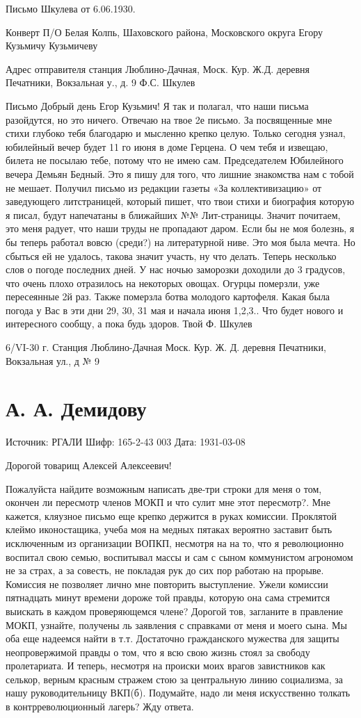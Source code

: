 \documentclass[]{memoir}
\begin{document}
Письмо Шкулева от 6.06.1930.


Конверт
П/О Белая Колпь, Шаховского района, Московского округа
Егору Кузьмичу Кузьмичеву

Адрес отправителя
станция Люблино-Дачная, Моск. Кур. Ж.Д. деревня Печатники, Вокзальная у., д. 9 Ф.С. Шкулев


Письмо
Добрый день 
Егор Кузьмич!
Я так и полагал, что наши письма разойдутся, но это ничего. Отвечаю на твое 2е письмо. За посвященные мне стихи глубоко тебя благодарю и мысленно крепко целую. Только сегодня узнал, юбилейный вечер будет 11 го июня в доме Герцена. О чем тебя и извещаю, билета не посылаю тебе, потому что не имею сам.
Председателем Юбилейного вечера Демьян Бедный. Это я пишу для того, что лишние знакомства нам с тобой не мешает. 
Получил письмо из редакции газеты «За коллективизацию» от заведующего литстраницей, который пишет, что твои стихи и биография которую я писал, будут напечатаны в ближайших №№ Лит-страницы. Значит почитаем, это меня радует, что наши труды не пропадают даром.
Если бы не моя болезнь, я бы теперь работал вовсю (среди?) на литературной ниве. Это моя была мечта. Но сбыться ей не удалось, такова значит участь, ну что делать.
Теперь несколько слов о погоде последних дней. У нас ночью заморозки доходили до 3 градусов, что очень плохо отразилось на некоторых овощах. Огурцы померзли, уже пересеянные 2й раз. Также померзла ботва молодого картофеля. Какая была погода у Вас в эти дни 29, 30, 31 мая и начала июня 1,2,3..
Что будет нового и интересного сообщу, а пока будь здоров.
Твой Ф. Шкулев

6/VI-30 г.
Станция Люблино-Дачная Моск. Кур. Ж. Д. 
деревня Печатники, Вокзальная ул., д № 9


\section{А. А. Демидову}

Источник: РГАЛИ
Шифр: 165-2-43 003
Дата: 1931-03-08

Дорогой товарищ
Алексей Алексеевич!

Пожалуйста найдите возможным написать две-три строки для меня о том, окончен ли пересмотр членов МОКП и что сулит мне этот пересмотр?.
Мне кажется, кляузное письмо еще крепко держится в руках комиссии. Проклятой клеймо иконостащика, учеба моя на медных пятаках вероятно заставит быть исключенным из организации ВОПКП, несмотря на на то, что я революционно воспитал свою семью, воспитывал массы и сам с сыном коммунистом агрономом не за страх, а за совесть, не покладая рук до сих пор работаю на прорыве.
Комиссия не позволяет лично мне повторить выступление. Ужели комиссии пятнадцать минут времени дороже той правды, которую она сама стремится выискать в каждом проверяющемся члене?
Дорогой тов, загланите в правление МОКП, узнайте, получены ль заявления с справками от меня и моего сына. Мы оба еще надеемся найти в т.т. Достаточно гражданского мужества для защиты неопровержимой правды о том, что я всю свою жизнь стоял за свободу пролетариата.
И теперь, несмотря на происки моих врагов завистников как селькор, верным красным стражем стою за центральную линию социализма, за нашу руководительницу ВКП(б). Подумайте, надо ли меня искусственно толкать в контрреволюционный лагерь? Жду ответа.
\end{document}
